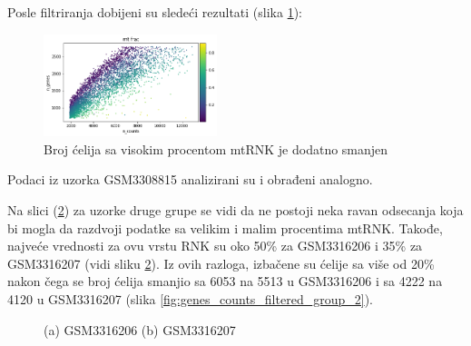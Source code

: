 \documentclass{article}
\begin{document}
Posle filtriranja dobijeni su sledeći rezultati (slika \ref{fig:n_counts_after_filtering_genes}):  

\begin{figure}[!h]
    \centering
    \includegraphics[width=0.45\textwidth]{GSM3308814-genes-counts-filtered2.png}
    \caption{ Broj ćelija sa visokim procentom mtRNK je dodatno smanjen }
    \label{fig:n_counts_after_filtering_genes}
\end{figure}

\newpage

Podaci iz uzorka GSM3308815 analizirani su i obrađeni analogno.

Na slici (\ref{fig:genes_counts_group_2}) za uzorke druge grupe se vidi da ne postoji neka ravan odsecanja koja bi mogla da razdvoji podatke sa velikim i malim procentima mtRNK. Takođe, najveće vrednosti za ovu vrstu RNK su oko 50\% za GSM3316206 i 35\% za GSM3316207 (vidi sliku \ref{fig:genes_counts_group_2}). Iz ovih razloga, izbačene su ćelije sa više od 20\% nakon čega se broj ćelija smanjio sa 6053 na 5513 u GSM3316206 i sa 4222 na 4120 u GSM3316207 (slika \ref{fig:genes_counts_filtered_group_2}).

\begin{figure}[!h]
    \centering
    \caption{ (a) GSM3316206 (b) GSM3316207 }
    \label{fig:genes_counts_group_2}
\end{figure}
\end{document}
